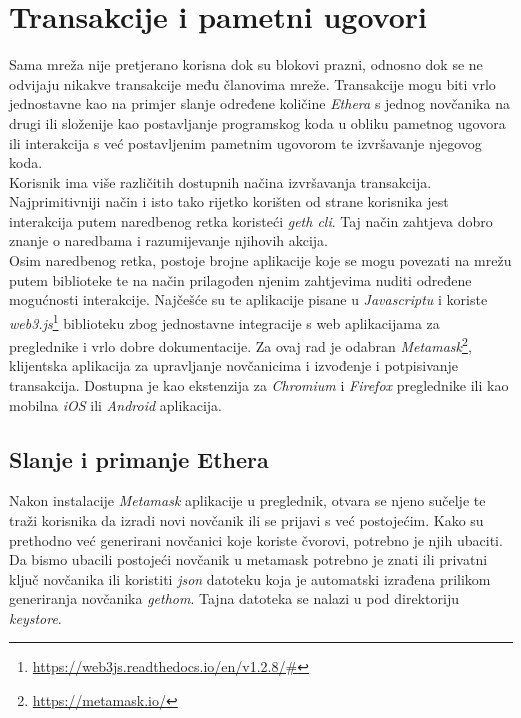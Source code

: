 \documentclass[times, utf8, zavrsni]{fer}
\begin{document}
\section{Transakcije i pametni ugovori}
Sama mreža nije pretjerano korisna dok su blokovi prazni, odnosno dok se ne odvijaju nikakve transakcije među članovima mreže. Transakcije mogu biti vrlo jednostavne
kao na primjer slanje određene količine \emph{Ethera} s jednog novčanika na drugi ili složenije kao postavljanje programskog koda u obliku pametnog ugovora ili interakcija
s već postavljenim pametnim ugovorom te izvršavanje njegovog koda. \\
Korisnik ima više različitih dostupnih načina izvršavanja transakcija. Najprimitivniji način i isto tako rijetko korišten od strane korisnika jest interakcija putem
naredbenog retka koristeći \emph{geth cli}. Taj način zahtjeva dobro znanje o naredbama i razumijevanje njihovih akcija. \\
Osim naredbenog retka, postoje brojne aplikacije koje se mogu povezati na mrežu putem biblioteke te na način prilagođen njenim zahtjevima nuditi određene mogućnosti
interakcije. Najčešće su te aplikacije pisane u \emph{Javascriptu} i koriste \emph{web3.js}\footnote{\url{https://web3js.readthedocs.io/en/v1.2.8/#}} biblioteku zbog
jednostavne integracije s web aplikacijama za preglednike i vrlo dobre dokumentacije.
Za ovaj rad je odabran \emph{Metamask}\footnote{\url{https://metamask.io/}}, klijentska aplikacija za upravljanje novčanicima i izvođenje i potpisivanje transakcija. 
Dostupna je kao ekstenzija za \emph{Chromium} i \emph{Firefox} preglednike ili kao mobilna \emph{iOS} ili \emph{Android} aplikacija. 
\subsection{Slanje i primanje Ethera}
Nakon instalacije \emph{Metamask} aplikacije u preglednik, otvara se njeno sučelje te traži korisnika da izradi novi novčanik ili se prijavi s već postojećim.
Kako su prethodno već generirani novčanici koje koriste čvorovi, potrebno je njih ubaciti. Da bismo ubacili postojeći novčanik u metamask potrebno je znati ili
privatni ključ novčanika ili koristiti \emph{json} datoteku koja je automatski izrađena prilikom generiranja novčanika \emph{gethom}. Tajna datoteka se nalazi
u pod direktoriju \emph{keystore}.
\end{document}
